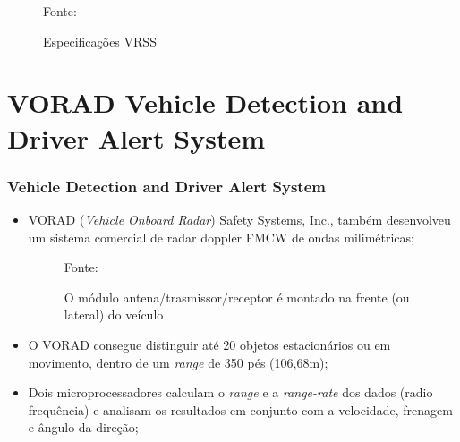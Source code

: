 \documentclass[xcolor=dvipsnames, aspectratio=169]{beamer}
\begin{document}
\begin{frame}
\begin{itemize}
\begin{figure}
            {Fonte: \cite{everett1995sensors}}
            \caption{Especificações VRSS}
            \label{fig:curva_de_freq}
        \end{figure}
	\end{itemize}
\end{frame}


\section[VORAD Vehicle Detection and Driver Alert System]{VORAD Vehicle Detection and Driver Alert System} 

\begin{frame}
\frametitle{Vehicle Detection and Driver Alert System}
	\begin{itemize}
		\item VORAD (\textit{Vehicle Onboard Radar}) Safety Systems, Inc., também desenvolveu um sistema comercial de radar doppler FMCW de ondas milimétricas;
        \begin{figure}
            \centering
            {Fonte: \cite{everett1995sensors}}
            \caption{O módulo antena/trasmissor/receptor é montado na frente (ou lateral) do veículo}
            \label{fig:curva_de_freq}
        \end{figure}
		\item O VORAD consegue distinguir até 20 objetos estacionários ou em movimento, dentro de um \textit{range} de 350 pés (106,68m);
		\item Dois microprocessadores calculam o \textit{range} e a \textit{range-rate} dos dados (radio frequência) e analisam os resultados em conjunto com a velocidade, frenagem e ângulo da direção;

\end{itemize}
\end{frame}
\end{document}
